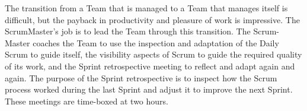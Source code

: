 The transition from a Team that is managed to a Team that manages itself is difficult, but the payback in productivity and pleasure of work is impressive. The ScrumMaster’s job is to lead the Team through this transition. The Scrum- Master coaches the Team to use the inspection and adaptation of the Daily Scrum to guide itself, the visibility aspects of Scrum to guide the required quality of its work, and the Sprint retrospective meeting to reflect and adapt again and again. The purpose of the Sprint retrospective is to inspect how the Scrum process worked during the last Sprint and adjust it to improve the next Sprint. These meetings are time-boxed at two hours.








